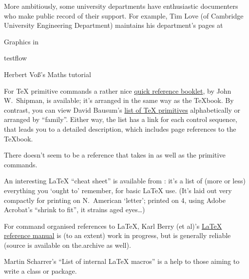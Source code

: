 More ambitiously, some university departments have enthusiastic
documenters who 
make public record of their \AllTeX{} support.  For example, Tim Love
(of Cambridge University Engineering Department) maintains his
department's pages at
\begin{ctanrefs}
\item[\nothtml{\rmfamily}Graphics in \LaTeXe{}]
\item[testflow]
\item[\nothtml{\rmfamily}Herbert Vo\ss {}'s Maths tutorial]
\end{ctanrefs}


For \TeX{} primitive commands a rather nice %
\href{http://www.nmt.edu/tcc/help/pubs/texcrib.pdf}{quick reference booklet},
by John W.~Shipman, is available; it's arranged in the same way as the
\TeX{}book.  By contrast, you can view David Bausum's %
\href{http://www.tug.org/utilities/plain/cseq.html}{list of \TeX{} primitives}
alphabetically or arranged by ``family''.  Either way, the list has a
link for each control sequence, that leads you to a detailed
description, which includes page references to the \TeX{}book.

There doesn't seem to be a reference that takes in \plaintex{} as
well as the primitive commands.

An interesting \LaTeX{} ``cheat sheet'' is available from :
it's a list of (more or less) everything you `ought to' remember, for
basic \LaTeX{} use. %
(It's laid out very compactly for printing on N.\ American `letter';
printed on  4, using Adobe Acrobat's ``shrink to
fit'', it strains aged eyes\dots{}) 

For command organised references to \LaTeX{},  Karl Berry (et
al)'s %
\href{http://home.gna.org/latexrefman}{LaTeX reference manual} is (to
an extent) work in progress, but is generally reliable (source is
available on the.archive as well).

Martin Scharrer's ``List of internal \LaTeX{} macros'' is a help to
those aiming to write a class or package.

